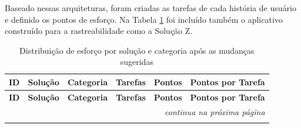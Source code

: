 	Baseado nessas arquiteturas, foram criadas as tarefas de cada história de usuário e definido os pontos de esforço. Na Tabela \ref{tab:esforco_solucoes_resultado} foi incluído
	também o aplicativo construído para a rastreabilidade como a Solução Z.

	\begin{longtable}{cccccc}
		\label{tab:esforco_solucoes_resultado} \\
		\toprule
		\textbf{ID} & \textbf{Solução} & \textbf{Categoria} & \textbf{Tarefas} & \textbf{Pontos} & \textbf{Pontos por Tarefa} \\
		\midrule
		\endfirsthead

		\toprule
		\textbf{ID} & \textbf{Solução} & \textbf{Categoria} & \textbf{Tarefas} & \textbf{Pontos} & \textbf{Pontos por Tarefa} \\
		\midrule
		\endhead

		\midrule
		\multicolumn{6}{r}{\textit{continua na próxima página}} \\
		\midrule
		\endfoot

		\bottomrule
		\caption{Distribuição de esforço por solução e categoria após as mudanças sugeridas}
		\endlastfoot


\end{longtable}
